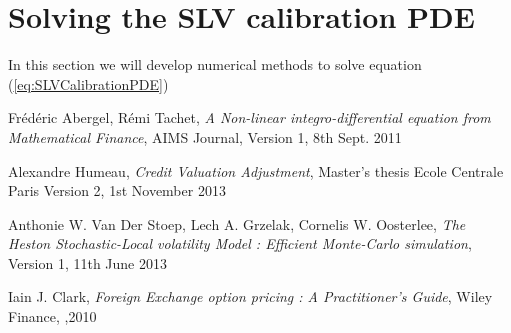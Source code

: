 \documentclass{article}
\begin{document}
\section{Solving the SLV calibration PDE}
In this section we will develop numerical methods to solve equation (\ref{eq:SLVCalibrationPDE})

\begin{thebibliography}{9}

  Frédéric Abergel, Rémi Tachet,
  \emph{A Non-linear integro-differential equation from Mathematical Finance},
  AIMS Journal,
  Version 1, 8th Sept. 2011

 Alexandre Humeau,
 \emph{Credit Valuation Adjustment},
 Master's thesis Ecole Centrale Paris
 Version 2, 
 1st November 2013

 Anthonie W. Van Der Stoep, Lech A. Grzelak, Cornelis W. Oosterlee,
 \emph{The Heston Stochastic-Local volatility Model : Efficient Monte-Carlo simulation},
 Version 1, 11th June 2013

 Iain J. Clark, 
 \emph{Foreign Exchange option pricing : A Practitioner's Guide},
 Wiley Finance,
 ,2010
\end{thebibliography}
\end{document}
